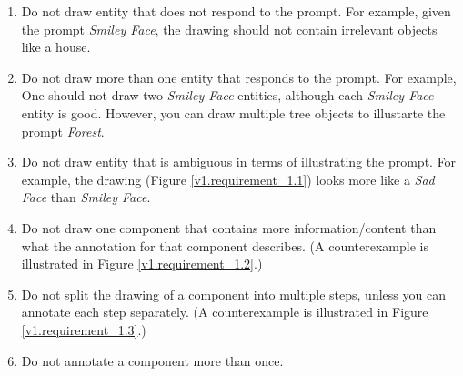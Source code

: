 \begin{enumerate}
\item Do not draw entity that does not respond to the prompt. For example, given the prompt \textit{Smiley Face}, the drawing should not contain irrelevant objects like a house. 
\item Do not draw more than one entity that responds to the prompt. For example, One should not draw two \textit{Smiley Face} entities, although each \textit{Smiley Face} entity is good. However, you can draw multiple tree objects to illustarte the prompt \textit{Forest}.  
\item \label{v1_requirement1_3} Do not draw entity that is ambiguous in terms of illustrating the prompt. For example, the drawing (Figure \ref{v1.requirement_1.1}) looks more like a \textit{Sad Face} than \textit{Smiley Face}.
\item Do not draw one component that contains more information/content than what the annotation for that component describes. (A counterexample is illustrated in Figure \ref{v1.requirement_1.2}.)
\item Do not split the drawing of a component into multiple steps, unless you can annotate each step separately. (A counterexample is illustrated in Figure \ref{v1.requirement_1.3}.)
\item Do not annotate a component more than once.
\end{enumerate}




